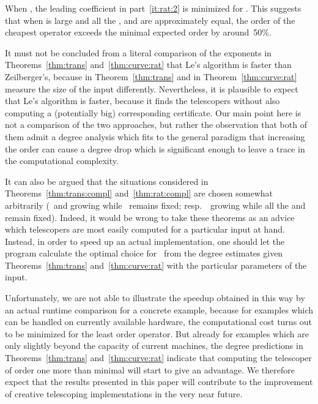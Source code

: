 \documentclass{sig-alternate}
\begin{document}
When , the leading coefficient in part~\ref{it:rat:2} is minimized
for . This suggests that when  is large and all the ,
and  are approximately equal, the order of the cheapest operator
exceeds the minimal expected order by around~50\%.

It must not be concluded from a literal comparison of the exponents in
Theorems~\ref{thm:trans} and~\ref{thm:curve:rat} that Le's algorithm is faster
than Zeilberger's, because  in Theorem~\ref{thm:trans} and  in
Theorem~\ref{thm:curve:rat} measure the size of the input differently. Nevertheless,
it is plausible to expect that Le's algorithm is faster, because it finds
the telescopers without also computing a (potentially big) corresponding
certificate. Our main point here is not a comparison of the two approaches, but
rather the observation that both of them admit a degree analysis which fits to the
general paradigm that increasing the order can cause a degree drop which is
significant enough to leave a trace in the computational complexity.

It can also be argued that the situations considered in
Theorems~\ref{thm:trans:compl} and~\ref{thm:rat:compl} are chosen somewhat
arbitrarily (~and  growing while ~remains fixed; resp.\
~growing while all the  and  remain fixed). Indeed, it would
be wrong to take these theorems as an advice which telescopers are most easily
computed for a particular input at hand. Instead, in order to speed up an actual
implementation, one should let the program calculate the optimal choice for~
from the degree estimates given Theorems~\ref{thm:trans} and~\ref{thm:curve:rat}
with the particular parameters of the input.

Unfortunately, we are not able to illustrate the speedup obtained in this way by
an actual runtime comparison for a concrete example, because for examples which
can be handled on currently available hardware, the computational cost turns out
to be minimized for the least order operator. But already for examples which are
only slightly beyond the capacity of current machines, the degree predictions in
Theorems~\ref{thm:trans} and~\ref{thm:curve:rat} indicate that computing the
telescoper of order one more than minimal will start to give an advantage. We
therefore expect that the results presented in this paper will contribute to the
improvement of creative telescoping implementations in the very near future.
\end{document}
